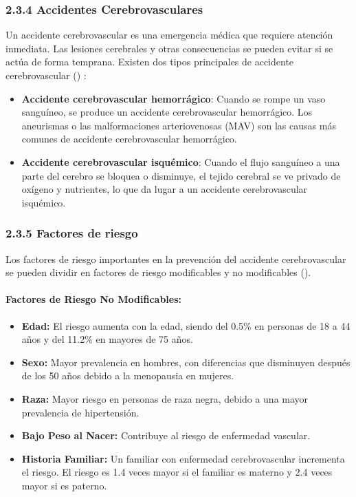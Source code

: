 \subsubsection{2.3.4 Accidentes Cerebrovasculares}
Un accidente cerebrovascular es una emergencia médica que requiere atención inmediata. Las lesiones cerebrales y otras consecuencias se pueden evitar si se actúa de forma temprana. Existen dos tipos principales de accidente cerebrovascular (\cite{upadhyay2022}) :
\begin{itemize}
    \item \textbf{Accidente cerebrovascular hemorrágico}: Cuando se rompe un vaso sanguíneo, se produce un accidente cerebrovascular hemorrágico. Los aneurismas o las malformaciones arteriovenosas (MAV) son las causas más comunes de accidente cerebrovascular hemorrágico.
    \item \textbf{Accidente cerebrovascular isquémico}: Cuando el flujo sanguíneo a una parte del cerebro se bloquea o disminuye, el tejido cerebral se ve privado de oxígeno y nutrientes, lo que da lugar a un accidente cerebrovascular isquémico.
\end{itemize}



\subsubsection{2.3.5 Factores de riesgo}

Los factores de riesgo importantes en la prevención del accidente cerebrovascular se pueden dividir en factores de riesgo modificables y no modificables (\cite{feiginstroke}).

\paragraph{Factores de Riesgo No Modificables:}
    \begin{itemize}
        \item \textbf{Edad: } El riesgo aumenta con la edad, siendo del 0.5\% en personas de 18 a 44 años y del 11.2\% en mayores de 75 años.
        \item \textbf{Sexo: } Mayor prevalencia en hombres, con diferencias que disminuyen después de los 50 años debido a la menopausia en mujeres.
        \item \textbf{Raza: } Mayor riesgo en personas de raza negra, debido a una mayor prevalencia de hipertensión.
        \item \textbf{Bajo Peso al Nacer: } Contribuye al riesgo de enfermedad vascular.
        \item \textbf{Historia Familiar: } Un familiar con enfermedad cerebrovascular incrementa el riesgo. El riesgo es 1.4 veces mayor si el familiar es materno y 2.4 veces mayor si es paterno.
    \end{itemize}

